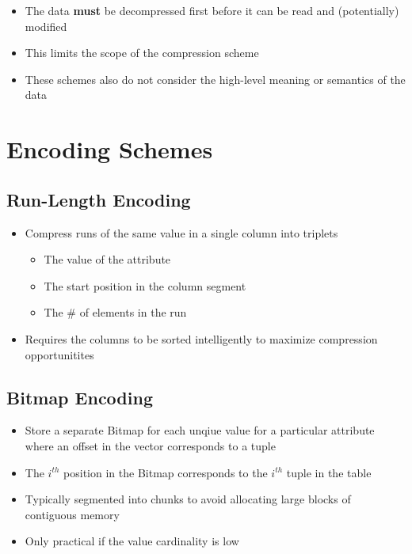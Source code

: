 \documentclass[11pt]{article}
\begin{document}
\begin{itemize}
    \item The data \textbf{must} be decompressed first before it can be read and (potentially) modified
    \item This limits the scope of the compression scheme
    \item These schemes also do not consider the high-level meaning or semantics of the data
\end{itemize}

\section{Encoding Schemes}

    \subsection*{Run-Length Encoding~\cite{p31-roth}}
    \begin{itemize}
        \item Compress runs of the same value in a single column into triplets
        \begin{itemize}
            \item The value of the attribute
            \item The start position in the column segment
            \item The \# of elements in the run
        \end{itemize}
        \item Requires the columns to be sorted intelligently to maximize compression opportunitites
    \end{itemize}

    \subsection*{Bitmap Encoding~\cite{franklin14}}
    \begin{itemize}
        \item Store a separate Bitmap for each unqiue value for a particular attribute where an offset in the vector corresponds to a tuple
        \item The $i^{th}$ position in the Bitmap corresponds to the $i^{th}$ tuple in the table
        \item Typically segmented into chunks to avoid allocating large blocks of contiguous memory
        \item Only practical if the value cardinality is low
    \end{itemize}
\end{document}
